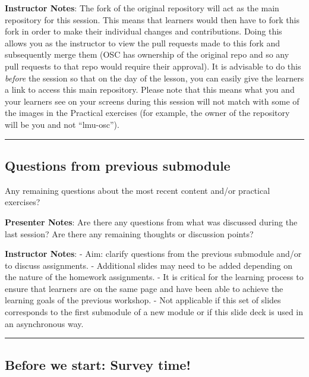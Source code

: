 \documentclass[
  letterpaper,
  DIV=11,
  numbers=noendperiod]{scrartcl}
\begin{document}
\textbf{Instructor Notes}: The fork of the original repository will act
as the main repository for this session. This means that learners would
then have to fork this fork in order to make their individual changes
and contributions. Doing this allows you as the instructor to view the
pull requests made to this fork and subsequently merge them (OSC has
ownership of the original repo and so any pull requests to that repo
would require their approval). It is advisable to do this \emph{before}
the session so that on the day of the lesson, you can easily give the
learners a link to access this main repository. Please note that this
means what you and your learners see on your screens during this session
will not match with some of the images in the Practical exercises (for
example, the owner of the repository will be you and not ``lmu-osc'').

\begin{center}\rule{0.5\linewidth}{0.5pt}\end{center}

\subsection{Questions from previous
submodule}\label{questions-from-previous-submodule}

Any remaining questions about the most recent content and/or practical
exercises?

\textbf{Presenter Notes}: Are there any questions from what was
discussed during the last session? Are there any remaining thoughts or
discussion points?

\textbf{Instructor Notes}: - Aim: clarify questions from the previous
submodule and/or to discuss assignments. - Additional slides may need to
be added depending on the nature of the homework assignments. - It is
critical for the learning process to ensure that learners are on the
same page and have been able to achieve the learning goals of the
previous workshop. - Not applicable if this set of slides corresponds to
the first submodule of a new module or if this slide deck is used in an
asynchronous way.

\begin{center}\rule{0.5\linewidth}{0.5pt}\end{center}

\subsection{Before we start: Survey
time!}\label{before-we-start-survey-time}
\end{document}
